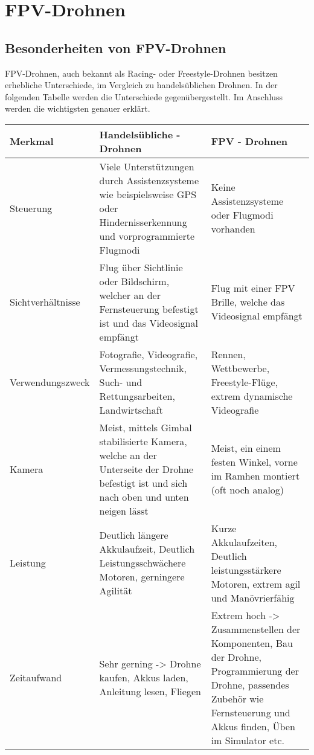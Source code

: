 \section[FPV-Drohnen]{FPV-Drohnen}
\subsection[Besonderheiten von FPV-Drohnen]{Besonderheiten von FPV-Drohnen}

    FPV-Drohnen, auch bekannt als Racing- oder Freestyle-Drohnen besitzen erhebliche Unterschiede, im Vergleich zu handelsüblichen Drohnen. In der folgenden Tabelle werden die Unterschiede gegenübergestellt. Im Anschluss werden die wichtigsten genauer erklärt. 

    \vspace{0.5cm}
    \renewcommand{\arraystretch}{1.5}
    \begin{tabular}{p{3cm}p{5.86cm}p{5.86cm}}
    \toprule
    \textbf{Merkmal} & \textbf{Handelsübliche - Drohnen} & \textbf{FPV - Drohnen} \\
    \midrule
    Steuerung           & Viele Unterstützungen durch Assistenzsysteme wie beispielsweise GPS oder Hindernisserkennung und vorprogrammierte Flugmodi               & Keine Assistenzsysteme oder Flugmodi vorhanden \\
    Sichtverhältnisse   & Flug über Sichtlinie oder Bildschirm, welcher an der Fernsteuerung befestigt ist und das Videosignal empfängt                            & Flug mit einer FPV Brille, welche das Videosignal empfängt \\
    Verwendungszweck    & Fotografie, Videografie, Vermessungstechnik, Such- und Rettungsarbeiten, Landwirtschaft                                                  & Rennen, Wettbewerbe, Freestyle-Flüge, extrem dynamische Videografie \\
    Kamera              & Meist, mittels Gimbal stabilisierte Kamera, welche an der Unterseite der Drohne befestigt ist und sich nach oben und unten neigen lässt  & Meist, ein einem festen Winkel, vorne im Ramhen montiert (oft noch analog) \\
    Leistung            & Deutlich längere Akkulaufzeit, Deutlich Leistungsschwächere Motoren, gerningere Agilität                                                 & Kurze Akkulaufzeiten, Deutlich leistungsstärkere Motoren, extrem agil und Manövrierfähig \\
    Zeitaufwand         & Sehr gerning -> Drohne kaufen, Akkus laden, Anleitung lesen, Fliegen                                                                     & Extrem hoch -> Zusammenstellen der Komponenten, Bau der Drohne, Programmierung der Drohne, passendes Zubehör wie Fernsteuerung und Akkus finden, Üben im Simulator etc. \\
    \bottomrule
    \end{tabular}
    \vspace{0.5cm}

